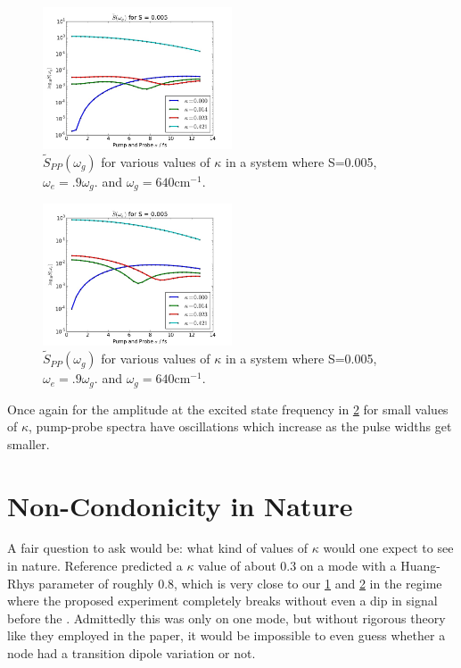 \begin{figure}
   \includegraphics[width=0.5\textwidth]{images/s0point005_omega_g.jpg}
   \caption{$\tilde{S}_{PP} ( \omega_g)$ for various values of $\kappa$ in a system where S=0.005, $\omega_e = .9 \omega_g$. and $\omega_g = 640 \text{cm}^{-1}$.  }
	\label{fig:detunedSmallGround}
\end{figure}


\begin{figure}
   \includegraphics[width=0.5\textwidth]{images/s0point005_omega_e.jpg}
   \caption{$\tilde{S}_{PP} ( \omega_g)$ for various values of $\kappa$ in a system where S=0.005, $\omega_e = .9 \omega_g$. and $\omega_g = 640 \text{cm}^{-1}$.  }
	\label{fig:detunedSmallExcited}
\end{figure}
Once again for the amplitude at the excited state frequency in \ref{fig:detunedSmallExcited} for small values of $\kappa$, pump-probe spectra have oscillations which increase as the pulse widths get smaller.

\section{Non-Condonicity in Nature}
A fair question to ask would be: what kind of values of $\kappa$ would one expect to see in nature.  Reference \cite{photosyntheticKappa} predicted a $\kappa$ value of about 0.3 on a mode with a Huang-Rhys parameter of roughly 0.8, which is very close to our \ref{fig:detunedSmallGround} and \ref{fig:detunedSmallExcited} in the regime where the proposed experiment completely breaks without even a dip in signal before the .  Admittedly this was only on one mode, but without rigorous theory like they employed in the paper, it would be impossible to even guess whether a node had a transition dipole variation or not.

